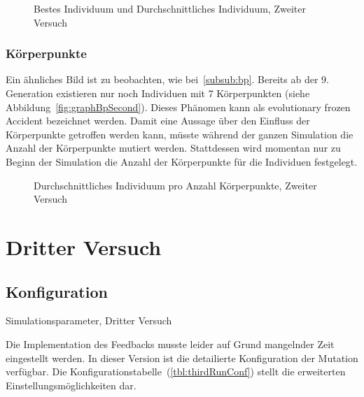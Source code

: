       \begin{figure}
        \centering
        
        \caption{Bestes Individuum und Durchschnittliches Individuum, Zweiter Versuch\label{fig:graphSecond}}
      \end{figure}

      \subsubsection{Körperpunkte\label{subsub:bpScnd}}

        Ein ähnliches Bild ist zu beobachten, wie bei~\vref{subsub:bp}.
        Bereits ab der 9\@. Generation existieren nur noch Individuen mit 7 Körperpunkten (siehe Abbildung~\vref{fig:graphBpSecond}).
        Dieses Phänomen kann als evolutionary frozen Accident bezeichnet werden.
        Damit eine Aussage über den Einfluss der Körperpunkte getroffen werden kann,
        müsste während der ganzen Simulation die Anzahl der Körperpunkte mutiert werden.
        Stattdessen wird momentan nur zu Beginn der Simulation die Anzahl der Körperpunkte für die Individuen festgelegt.

        \begin{figure}
          \centering
          
          \caption{Durchschnittliches Individuum pro Anzahl Körperpunkte, Zweiter Versuch\label{fig:graphBpSecond}}
        \end{figure}

    \section{Dritter Versuch}

      \subsection{Konfiguration}

        \begin{table}[H]
          \centering
          
          \caption{Simulationsparameter, Dritter Versuch \label{tbl:thirdRunConf}}
        \end{table}

        Die Implementation des Feedbacks musste leider auf Grund mangelnder Zeit eingestellt werden.
        In dieser Version ist die detailierte Konfiguration der Mutation verfügbar.
        Die Konfigurationstabelle~(\vref{tbl:thirdRunConf}) stellt die erweiterten Einstellungsmöglichkeiten dar.


